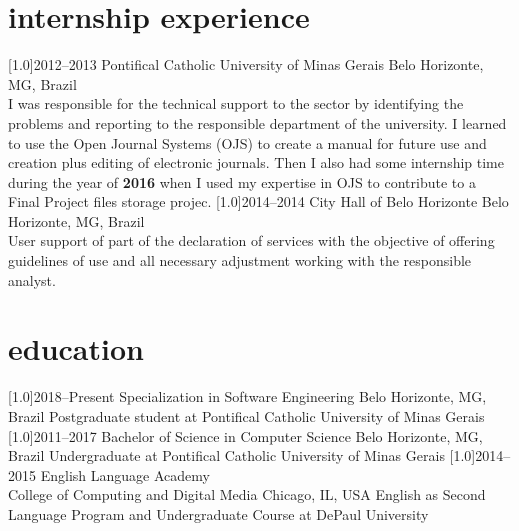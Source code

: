 \documentclass[portuguese]{cv-style}     %
\begin{document}
\section{internship experience}
  \vspace{-0.2cm}
\begin{entrylist}
\entry
  {\scalebox{.8}[1.0]{2012--2013}}
  {Pontifical Catholic University of Minas Gerais}
  {Belo Horizonte, MG, Brazil}
  {\\
  I was responsible for the technical support to the sector by identifying the problems and reporting to the responsible department of the university. I learned to use the Open Journal Systems (OJS) to create a manual for future use and creation plus editing of electronic journals.
  Then I also had some internship time during the year of \textbf{2016} when I used my expertise in OJS to contribute to a Final Project files storage projec.}
\vspace{-0.3cm}
\entry
  {\scalebox{.8}[1.0]{2014--2014}}
  {City Hall of Belo Horizonte}
  {Belo Horizonte, MG, Brazil}
  {\\
  User support of part of the declaration of services with the objective of offering guidelines of use and all necessary adjustment working with the responsible analyst.
  }
\end{entrylist}

\section{education}
  \vspace{-0.2cm}
\begin{entrylist}
\entry
{\scalebox{.8}[1.0]{2018--Present}}
{Specialization in Software Engineering}
{Belo Horizonte, MG, Brazil}
{\small{Postgraduate student at Pontifical Catholic University of Minas Gerais}}
\entry
{\scalebox{.8}[1.0]{2011--2017}}
{Bachelor of Science in Computer Science}
{Belo Horizonte, MG, Brazil}
{\small{Undergraduate at Pontifical Catholic University of Minas Gerais}}
\entry
{\scalebox{.8}[1.0]{2014--2015}}
{English Language Academy\\ College of Computing and Digital Media}
{Chicago, IL, USA}
{\small{English as Second Language Program and Undergraduate Course at DePaul University}}
\end{entrylist}
\end{document}
